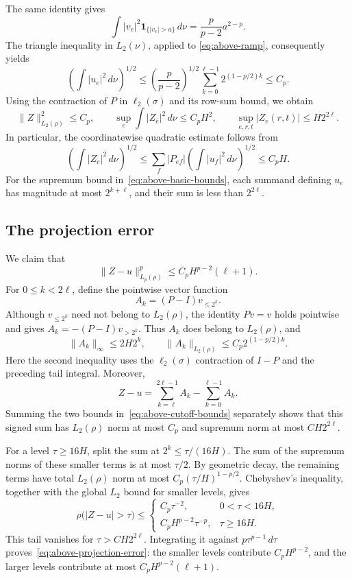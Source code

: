 \documentclass[11pt]{article}
\theoremstyle{remark}
\numberwithin{equation}{section}
\begin{document}
The same identity gives
\[
 \int |v_e|^2\mathbf 1_{\{|v_e|>a\}}\,d\nu
   =\frac{p}{p-2}a^{2-p}.
\]
The triangle inequality in $L_2(\nu)$, applied to
\eqref{eq:above-ramp}, consequently yields
\[
 \left(\int |u_e|^2\,d\nu\right)^{1/2}
 \le \left(\frac{p}{p-2}\right)^{1/2}
       \sum_{k=0}^{\ell-1}2^{(1-p/2)k}
 \le C_p.
\]
Using the contraction of $P$ in $\ell_2(\sigma)$ and its row-sum bound,
we obtain
\begin{equation}
 \|Z\|_{L_2(\rho)}^2\le C_p,
 \qquad
 \sup_e\int |Z_e|^2\,d\nu\le C_pH^2,
 \qquad
 \sup_{e,r,t}|Z_e(r,t)|\le H2^{2\ell}.
\label{eq:above-basic-bounds}
\end{equation}
In particular, the coordinatewise quadratic estimate follows from
\[
 \left(\int|Z_e|^2\,d\nu\right)^{1/2}
 \le\sum_f|P_{ef}|\left(\int|u_f|^2\,d\nu\right)^{1/2}
 \le C_pH.
\]
For the supremum bound in~\eqref{eq:above-basic-bounds}, each summand
defining $u_e$ has magnitude at
most $2^{k+\ell}$, and their sum is less than $2^{2\ell}$.

\subsection{The projection error}

We claim that
\begin{equation}
 \|Z-u\|_{L_p(\rho)}^p
       \le C_p H^{p-2}(\ell+1).
 \label{eq:above-projection-error}
\end{equation}
For $0\le k<2\ell$, define the pointwise vector function
\[
 A_k=(P-I)v_{\le2^k}.
\]
Although $v_{\le2^k}$ need not belong to $L_2(\rho)$, the identity
$Pv=v$ holds pointwise and gives
$A_k=-(P-I)v_{>2^k}$. Thus $A_k$ does belong to $L_2(\rho)$, and
\begin{equation}
 \|A_k\|_\infty\le 2H2^k,
 \qquad
 \|A_k\|_{L_2(\rho)}\le C_p2^{(1-p/2)k}.
 \label{eq:above-cutoff-bounds}
\end{equation}
Here the second inequality uses the $\ell_2(\sigma)$ contraction of
$I-P$ and the preceding tail integral. Moreover,
\[
 Z-u=\sum_{k=\ell}^{2\ell-1}A_k-\sum_{k=0}^{\ell-1}A_k.
\]
Summing the two bounds in~\eqref{eq:above-cutoff-bounds} separately
shows that this signed sum has $L_2(\rho)$ norm at most $C_p$ and
supremum norm at most $CH2^{2\ell}$.

For a level $\tau\ge16H$, split the sum at
$2^k\le\tau/(16H)$. The sum of the supremum norms of these smaller
terms is at most $\tau/2$. By geometric decay, the remaining terms
have total $L_2(\rho)$ norm at most
$C_p(\tau/H)^{1-p/2}$. Chebyshev's inequality, together with the
global $L_2$ bound for smaller levels, gives
\[
 \rho\bigl(|Z-u|>\tau\bigr)\le
 \begin{cases}
 C_p\tau^{-2},&0<\tau<16H,\\
 C_pH^{p-2}\tau^{-p},&\tau\ge16H.
 \end{cases}
\]
This tail vanishes for $\tau>CH2^{2\ell}$. Integrating it against
$p\tau^{p-1}\,d\tau$ proves~\eqref{eq:above-projection-error}:
the smaller levels contribute $C_pH^{p-2}$, and the larger levels
contribute at most $C_pH^{p-2}(\ell+1)$.
\end{document}
